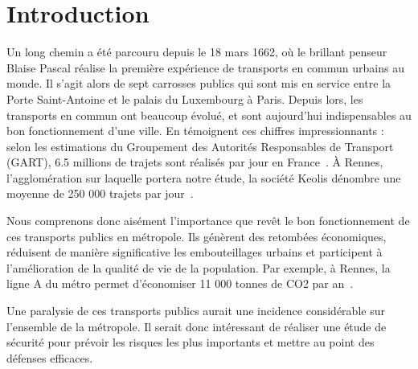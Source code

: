 \section{Introduction}
	Un long chemin a été parcouru depuis le 18 mars 1662, où le brillant penseur Blaise Pascal réalise la première expérience de transports en commun urbains au monde. Il s'agit alors de sept carrosses publics qui sont mis en service entre la Porte Saint-Antoine et le palais du Luxembourg à Paris. Depuis lors, les transports en commun ont beaucoup évolué, et sont aujourd'hui indispensables au bon fonctionnement d'une ville. En témoignent ces chiffres impressionnants : selon les estimations du Groupement des Autorités Responsables de Transport (GART), 6.5 millions de trajets sont réalisés par jour en France~\cite{Gart}. \`A Rennes, l'agglomération sur laquelle portera notre étude, la société Keolis dénombre une moyenne de 250 000 trajets par jour~\cite{Keolis}. 

	Nous comprenons donc aisément l'importance que revêt le bon fonctionnement de ces transports publics en métropole. Ils génèrent des retombées économiques, réduisent de manière significative les embouteillages urbains et participent à l’amélioration de la qualité de vie de la population. Par exemple, à Rennes, la ligne A du métro permet d'économiser 11 000 tonnes de CO2 par an~\cite{bilanLA}. 

	Une paralysie de ces transports publics aurait une incidence considérable sur l'ensemble de la métropole. Il serait donc intéressant de réaliser une étude de sécurité pour prévoir les risques les plus importants et mettre au point des défenses efficaces. 

























